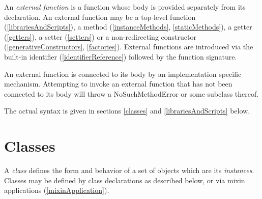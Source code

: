 \documentclass{article}
\newcommand{\code}[1]{{\sf #1}}
\begin{document}
\LMHash{}
An {\em external function} is a function whose body is provided separately from its declaration. An external function may be a top-level function (\ref{librariesAndScripts}), a method (\ref{instanceMethods}, \ref{staticMethods}), a getter (\ref{getters}), a setter (\ref{setters}) or a non-redirecting constructor (\ref{generativeConstructors}, \ref{factories}). External functions are introduced via the built-in identifier \EXTERNAL{}  (\ref{identifierReference}) followed by the function signature.



\LMHash{}
An external function is connected to its body by an implementation specific mechanism. Attempting to invoke an external function that has not been connected to its body will throw a \code{NoSuchMethodError} or some subclass thereof.

\LMHash{}
The actual syntax is given in sections \ref{classes} and \ref{librariesAndScripts} below.

\section{Classes}

\LMHash{}
A {\em class} defines the form and behavior of a set of objects which are its {\em instances}.  Classes may be defined by class declarations as described below, or via mixin applications (\ref{mixinApplication}).
\end{document}
